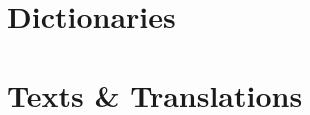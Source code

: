 \documentclass[a4paper,11pt,oneside,openany]{memoir}
\begin{document}



\part{Dictionaries}



\part{Texts \& Translations}

\end{document}
